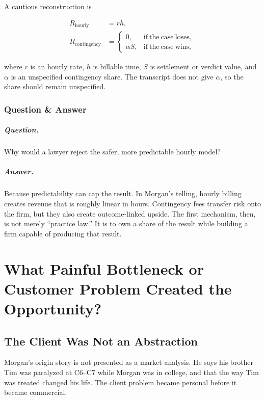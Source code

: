 \documentclass[11pt,oneside]{book}
\begin{document}
A cautious reconstruction is

\begin{align}
R_{\mathrm{hourly}} &= r h,\\
R_{\mathrm{contingency}} &=
\begin{cases}
0, & \mathrm{if\ the\ case\ loses},\\
\alpha S, & \mathrm{if\ the\ case\ wins},
\end{cases}
\end{align}

where \(r\) is an hourly rate, \(h\) is billable time, \(S\) is settlement or verdict value, and \(\alpha\) is an unspecified contingency share. The transcript does not give \(\alpha\), so the share should remain unspecified.

\subsection{Question \& Answer}

\paragraph{Question.}
Why would a lawyer reject the safer, more predictable hourly model?

\paragraph{Answer.}
Because predictability can cap the result. In Morgan's telling, hourly billing creates revenue that is roughly linear in hours. Contingency fees transfer risk onto the firm, but they also create outcome-linked upside. The first mechanism, then, is not merely ``practice law.'' It is to own a share of the result while building a firm capable of producing that result.

\chapter{What Painful Bottleneck or Customer Problem Created the Opportunity?}

\section{The Client Was Not an Abstraction}

Morgan's origin story is not presented as a market analysis. He says his brother Tim was paralyzed at C6--C7 while Morgan was in college, and that the way Tim was treated changed his life. The client problem became personal before it became commercial.
\end{document}
